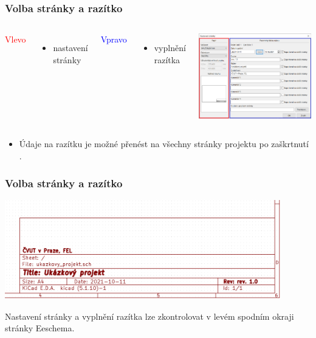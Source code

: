 \documentclass{beamer}
\begin{document}
\begin{frame}
	\frametitle{Volba stránky a razítko}
	\begin{columns}
	
		\small
		\textcolor{red}{Vlevo}
		\begin{itemize}
			\item nastavení stránky
		\end{itemize}
		\textcolor{blue}{Vpravo}
		\begin{itemize}
			\item vyplnění razítka
		\end{itemize}
		
		\begin{center}
			\includegraphics[width=\textwidth]{obr/razitko02.png}
		\end{center}
		
	\end{columns}
	
	
	\begin{itemize}
		\item Údaje na razítku je možné přenést na všechny stránky projektu po zaškrtnutí .
	\end{itemize}
\end{frame}
\begin{frame}
	\frametitle{Volba stránky a razítko}

		\begin{center}
			\includegraphics[width=0.9\textwidth]{obr/razitko03.png}
		\end{center}
		
		Nastavení stránky a vyplnění razítka lze zkontrolovat v levém spodním okraji stránky Eeschema.
\end{frame}
\end{document}
